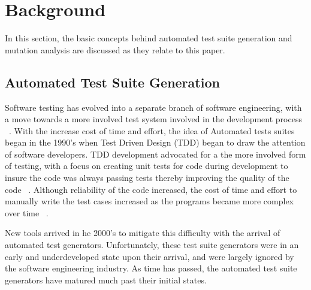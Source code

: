 \section{Background}
\label{sec:background}
In this section, the basic concepts behind automated test suite generation and mutation analysis are discussed as they relate to this paper.

\subsection{Automated Test Suite Generation}
Software testing has evolved into a separate branch of software engineering, with a move towards a more involved test system involved in the development process ~\cite{Gelperin:1988:GST:62959.62965}. With the increase cost of time and effort, the idea of Automated tests suites began in the 1990's when Test Driven Design (TDD) began to draw the attention of software developers. TDD development advocated for a the more involved form of testing, with a focus on creating unit tests for code during development to insure the code was always passing tests thereby improving the quality of the code ~\cite{Canfora:2006:EAT:1159733.1159788}.  Although reliability of the code increased, the cost of time and effort to manually write the test cases increased as the programs became more complex over time ~\cite{clarke1998automated}. 

New tools arrived in he 2000's to mitigate this difficulty with the arrival of automated test generators. Unfortunately, these test suite generators were in an early and underdeveloped state upon their arrival, and were largely ignored by the software engineering industry. As time has passed, the automated test suite generators have matured much past their initial states.

